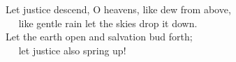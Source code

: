 
\lettrine{L}{}et justice descend, O heavens, like dew from above,\\
   like gentle rain let the skies drop it down. \\
Let the earth open and salvation bud forth;\\
   let justice also spring up!
